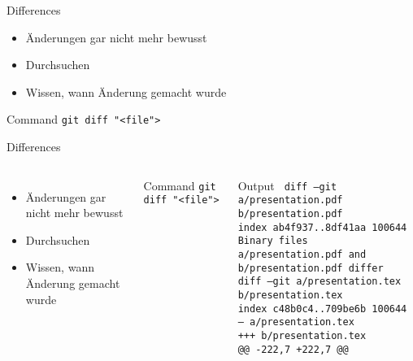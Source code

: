 \documentclass{beamer}
\begin{document}
    \begin{frame}{Differences}
      \begin{itemize}[<+->]
        \item Änderungen gar nicht mehr bewusst
        \item Durchsuchen
        \item Wissen, wann Änderung gemacht wurde
      \end{itemize}
      \begin{block}{Command}
        \texttt{git diff "<file">}
      \end{block}
    \end{frame}

    \begin{frame}{Differences}
      \begin{columns}
          \begin{itemize}
            \item Änderungen gar nicht mehr bewusst
            \item Durchsuchen
            \item Wissen, wann Änderung gemacht wurde
          \end{itemize}
          \begin{block}{Command}
            \texttt{git diff "<file">}
          \end{block}
          \vspace{20pt}
            \begin{block}{Output}
              \texttt{
                diff --git a/presentation.pdf b/presentation.pdf                \\
                index ab4f937..8df41aa 100644                                   \\
                Binary files a/presentation.pdf and b/presentation.pdf differ   \\
                diff --git a/presentation.tex b/presentation.tex                \\
                index c48b0c4..709be6b 100644                                   \\
                {\color{red}--- a/presentation.tex}                             \\
                {\color{green}+++ b/presentation.tex}                           \\
                @@ -222,7 +222,7 @@
              }
            \end{block}
      \end{columns}
    \end{frame}
\end{document}
